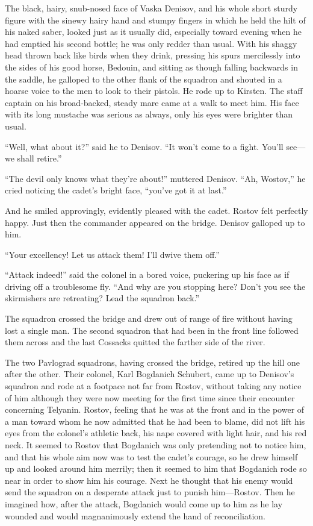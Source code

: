 The black, hairy, snub-nosed face of Vaska Denisov, and his whole
short sturdy figure with the sinewy hairy hand and stumpy fingers
in which he held the hilt of his naked saber, looked just as it
usually did, especially toward evening when he had emptied his
second bottle; he was only redder than usual. With his shaggy
head thrown back like birds when they drink, pressing his spurs
mercilessly into the sides of his good horse, Bedouin, and
sitting as though falling backwards in the saddle, he galloped to
the other flank of the squadron and shouted in a hoarse voice to
the men to look to their pistols. He rode up to Kirsten. The
staff captain on his broad-backed, steady mare came at a walk to
meet him. His face with its long mustache was serious as always,
only his eyes were brighter than usual.

``Well, what about it?'' said he to Denisov. ``It won't come to a
fight.  You'll see---we shall retire.''

``The devil only knows what they're about!'' muttered
Denisov. ``Ah, Wostov,'' he cried noticing the cadet's bright
face, ``you've got it at last.''

And he smiled approvingly, evidently pleased with the
cadet. Rostov felt perfectly happy. Just then the commander
appeared on the bridge. Denisov galloped up to him.

``Your excellency! Let us attack them! I'll dwive them off.''

``Attack indeed!'' said the colonel in a bored voice, puckering
up his face as if driving off a troublesome fly. ``And why are
you stopping here? Don't you see the skirmishers are retreating?
Lead the squadron back.''

The squadron crossed the bridge and drew out of range of fire
without having lost a single man. The second squadron that had
been in the front line followed them across and the last Cossacks
quitted the farther side of the river.

The two Pavlograd squadrons, having crossed the bridge, retired
up the hill one after the other. Their colonel, Karl Bogdanich
Schubert, came up to Denisov's squadron and rode at a footpace
not far from Rostov, without taking any notice of him although
they were now meeting for the first time since their encounter
concerning Telyanin. Rostov, feeling that he was at the front and
in the power of a man toward whom he now admitted that he had
been to blame, did not lift his eyes from the colonel's athletic
back, his nape covered with light hair, and his red neck. It
seemed to Rostov that Bogdanich was only pretending not to notice
him, and that his whole aim now was to test the cadet's courage,
so he drew himself up and looked around him merrily; then it
seemed to him that Bogdanich rode so near in order to show him
his courage. Next he thought that his enemy would send the
squadron on a desperate attack just to punish him---Rostov. Then
he imagined how, after the attack, Bogdanich would come up to him
as he lay wounded and would magnanimously extend the hand of
reconciliation.


